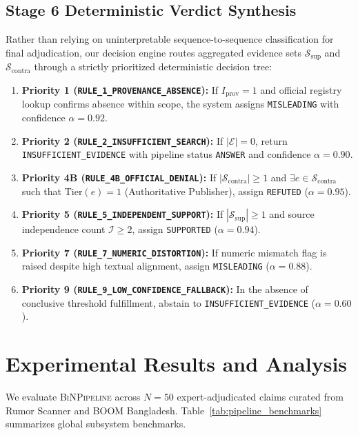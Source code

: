 \documentclass[11pt,a4paper]{article}
\begin{document}
\subsection{Stage 6 Deterministic Verdict Synthesis}
Rather than relying on uninterpretable sequence-to-sequence classification for final adjudication, our decision engine routes aggregated evidence sets $\mathcal{S}_{\text{sup}}$ and $\mathcal{S}_{\text{contra}}$ through a strictly prioritized deterministic decision tree:
\begin{enumerate}
    \item \textbf{Priority 1 (\texttt{RULE\_1\_PROVENANCE\_ABSENCE}):} If $I_{\text{prov}} = 1$ and official registry lookup confirms absence within scope, the system assigns \texttt{MISLEADING} with confidence $\alpha = 0.92$.
    \item \textbf{Priority 2 (\texttt{RULE\_2\_INSUFFICIENT\_SEARCH}):} If $|\mathcal{E}| = 0$, return \texttt{INSUFFICIENT\_EVIDENCE} with pipeline status \texttt{ANSWER} and confidence $\alpha = 0.90$.
    \item \textbf{Priority 4B (\texttt{RULE\_4B\_OFFICIAL\_DENIAL}):} If $|\mathcal{S}_{\text{contra}}| \ge 1$ and $\exists e \in \mathcal{S}_{\text{contra}}$ such that $\text{Tier}(e) = 1$ (Authoritative Publisher), assign \texttt{REFUTED} ($\alpha = 0.95$).
    \item \textbf{Priority 5 (\texttt{RULE\_5\_INDEPENDENT\_SUPPORT}):} If $|\mathcal{S}_{\text{sup}}| \ge 1$ and source independence count $\mathcal{I} \ge 2$, assign \texttt{SUPPORTED} ($\alpha = 0.94$).
    \item \textbf{Priority 7 (\texttt{RULE\_7\_NUMERIC\_DISTORTION}):} If numeric mismatch flag is raised despite high textual alignment, assign \texttt{MISLEADING} ($\alpha = 0.88$).
    \item \textbf{Priority 9 (\texttt{RULE\_9\_LOW\_CONFIDENCE\_FALLBACK}):} In the absence of conclusive threshold fulfillment, abstain to \texttt{INSUFFICIENT\_EVIDENCE} ($\alpha = 0.60$).
\end{enumerate}

\section{Experimental Results and Analysis}
\label{sec:results}
We evaluate \textsc{BiNPipeline} across $N=50$ expert-adjudicated claims curated from Rumor Scanner and BOOM Bangladesh. Table~\ref{tab:pipeline_benchmarks} summarizes global subsystem benchmarks.
\end{document}
